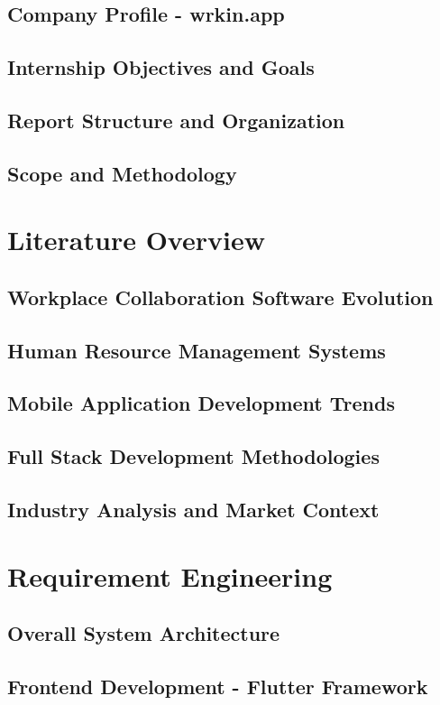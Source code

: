 \documentclass[a4paper, 11pt, oneside]{report}
\begin{document}
\section{Company Profile - wrkin.app}
\section{Internship Objectives and Goals}
\section{Report Structure and Organization}
\section{Scope and Methodology}


\chapter{Literature Overview}
\section{Workplace Collaboration Software Evolution}
\section{Human Resource Management Systems}
\section{Mobile Application Development Trends}
\section{Full Stack Development Methodologies}
\section{Industry Analysis and Market Context}


\chapter{Requirement Engineering}
\section{Overall System Architecture}
\section{Frontend Development - Flutter Framework}
\end{document}
